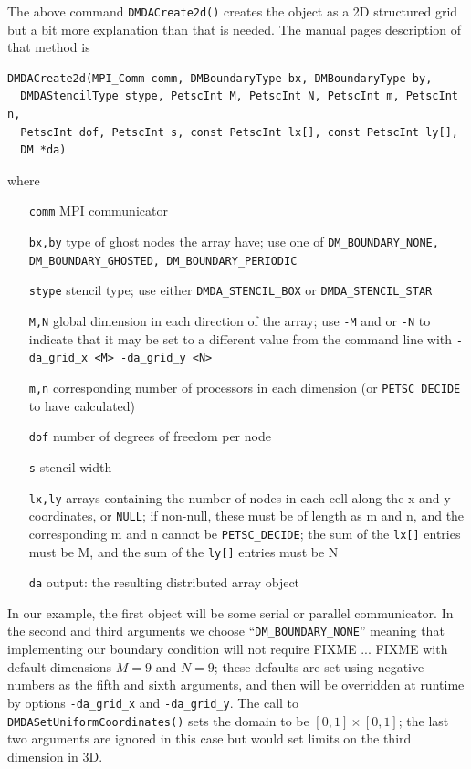 The above command \texttt{DMDACreate2d()} creates the \pDMDA object as a 2D structured grid but a bit more explanation than that is needed.   The \PETSc manual pages description of that method is
\begin{Verbatim}[fontsize=\small]
DMDACreate2d(MPI_Comm comm, DMBoundaryType bx, DMBoundaryType by,
  DMDAStencilType stype, PetscInt M, PetscInt N, PetscInt m, PetscInt n,
  PetscInt dof, PetscInt s, const PetscInt lx[], const PetscInt ly[],
  DM *da)
\end{Verbatim}
where
\small
\begin{itemize}[align=left]
\item[\texttt{comm}]   MPI communicator \\
\item[\texttt{bx,by}]  type of ghost nodes the array have; use one of \texttt{DM\_BOUNDARY\_NONE, DM\_BOUNDARY\_GHOSTED, DM\_BOUNDARY\_PERIODIC} \\
\item[\texttt{stype}] stencil type; use either \texttt{DMDA\_STENCIL\_BOX} or \texttt{DMDA\_STENCIL\_STAR} \\
\item[\texttt{M,N}]	   global dimension in each direction of the array; use \texttt{-M} and or \texttt{-N} to indicate that it may be set to a different value from the command line with \texttt{-da\_grid\_x <M> -da\_grid\_y <N>} \\
\item[\texttt{m,n}]   corresponding number of processors in each dimension (or \texttt{PETSC\_DECIDE} to have calculated) \\
\item[\texttt{dof}]     number of degrees of freedom per node \\
\item[\texttt{s}]       stencil width \\
\item[\texttt{lx,ly}]  arrays containing the number of nodes in each cell along the x and y coordinates, or \texttt{NULL}; if non-null, these must be of length as m and n, and the corresponding m and n cannot be \texttt{PETSC\_DECIDE}; the sum of the \texttt{lx[]} entries must be M, and the sum of the \texttt{ly[]} entries must be N \\
\item[\texttt{da}]      output: the resulting distributed array object 
\end{itemize}
\normalsize
In our example, the first object will be some serial or parallel \MPI communicator.  In the second and third arguments we choose ``\texttt{DM\_BOUNDARY\_NONE}'' meaning that implementing our boundary condition will not require FIXME ... FIXME with default dimensions $M=9$ and $N=9$; these defaults are set using negative numbers as the fifth and sixth arguments, and then will be overridden at runtime by options \texttt{-da\_grid\_x} and \texttt{-da\_grid\_y}.  The call to \texttt{DMDASetUniformCoordinates()} sets the domain to be $[0,1]\times[0,1]$; the last two arguments are ignored in this case but would set limits on the third dimension in 3D.


